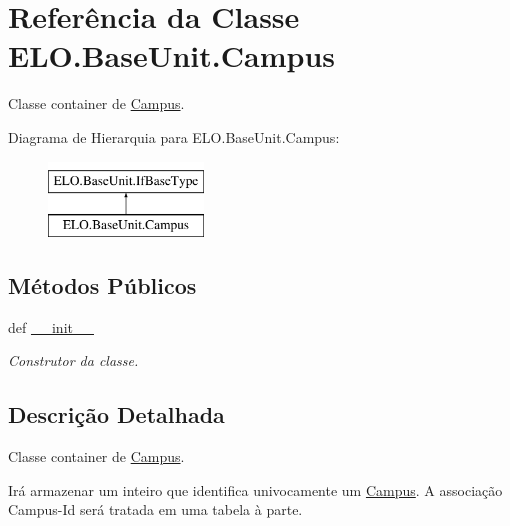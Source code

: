 \hypertarget{classELO_1_1BaseUnit_1_1Campus}{\section{Referência da Classe E\-L\-O.\-Base\-Unit.\-Campus}
\label{classELO_1_1BaseUnit_1_1Campus}
}


Classe container de \hyperlink{classELO_1_1BaseUnit_1_1Campus}{Campus}.  


Diagrama de Hierarquia para E\-L\-O.\-Base\-Unit.\-Campus\-:\begin{figure}[H]
\begin{center}
\leavevmode
\includegraphics[height=2.000000cm]{d4/d76/classELO_1_1BaseUnit_1_1Campus}
\end{center}
\end{figure}
\subsection*{Métodos Públicos}
\begin{DoxyCompactItemize}
\item 
def \hyperlink{classELO_1_1BaseUnit_1_1Campus_abd800984df4eb26836d305682d84dfa9}{\-\_\-\-\_\-init\-\_\-\-\_\-}
\begin{DoxyCompactList}\small\item\em Construtor da classe. \end{DoxyCompactList}\end{DoxyCompactItemize}


\subsection{Descrição Detalhada}
Classe container de \hyperlink{classELO_1_1BaseUnit_1_1Campus}{Campus}. 

Irá armazenar um inteiro que identifica univocamente um \hyperlink{classELO_1_1BaseUnit_1_1Campus}{Campus}. A associação Campus-\/\-Id será tratada em uma tabela à parte. 

